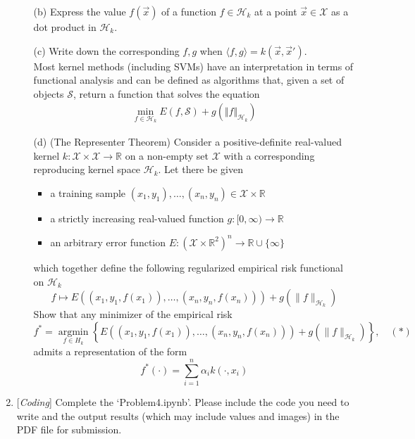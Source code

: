 \documentclass[10pt]{article}
\begin{document}
\begin{enumerate}
\begin{itemize}
\item[(b)] Express the value $f(\vec x)$ of a function $f\in\mathcal{H}_k$ at a point $\vec x\in\mathcal{X}$ as a dot product in $\mathcal{H}_k$.
\item[(c)] Write down the corresponding $f,g$ when $\langle f,g\rangle = k(\vec x,\vec x')$.\\

Most kernel methods (including SVMs) have an interpretation in terms of functional analysis and can be defined as algorithms that, given a set of objects $\mathcal{S}$, return a function that solves the equation
\begin{align*}
    \min_{f\in\mathcal{H}_k} E(f,\mathcal{S})+g(\Vert f\Vert_{\mathcal{H}_k})
\end{align*}

\item[(d)](The Representer Theorem) Consider a positive-definite real-valued kernel $k:\mathcal{X}\times \mathcal{X}\to \mathbb{R}$ on a non-empty set $\mathcal{X}$ with a corresponding reproducing kernel space $\mathcal{H}_k$. Let there be given
\begin{itemize}
    \item a training sample $(x_{1},y_{1}),\dotsc ,(x_{n},y_{n})\in \mathcal {X}\times \mathbb {R}$
    \item a strictly increasing real-valued function $g\colon [0,\infty )\to \mathbb {R}$
    \item an arbitrary error function 
$ E\colon ({\mathcal {X}}\times \mathbb {R} ^{2})^{n}\to \mathbb {R} \cup \lbrace \infty \rbrace $
\end{itemize}
which together define the following regularized empirical risk functional on $\mathcal{H}_k$
$$f\mapsto E\left((x_{1},y_{1},f(x_{1})),\ldots ,(x_{n},y_{n},f(x_{n}))\right)+g\left(\lVert f\rVert_{\mathcal{H}_k} \right)$$
Show that any minimizer of the empirical risk 
$$f^{*}={\underset {f\in H_{k}}{\operatorname {argmin} }}\left\lbrace E\left((x_{1},y_{1},f(x_{1})),\ldots ,(x_{n},y_{n},f(x_{n}))\right)+g\left(\lVert f\rVert_{\mathcal{H}_k} \right)\right\rbrace, \quad (*)$$
admits a representation of the form
$$f^{*}(\cdot )=\sum _{i=1}^{n}\alpha _{i}k(\cdot ,x_{i})$$
\end{itemize}



\newpage






\item {} {[}\textit{Coding}{]} Complete the `Problem4.ipynb'. Please include the code you need to write and the output results (which may include values and images) in the PDF file for submission.


\end{enumerate}
\end{document}
